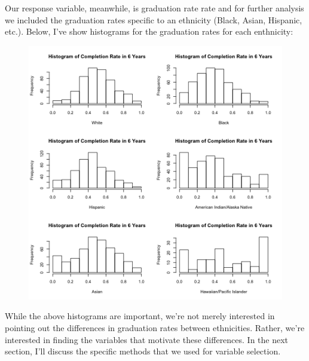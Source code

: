 \documentclass{article}
\begin{document}
Our response variable, meanwhile, is graduation rate rate and for further analysis we included the graduation rates specific to an ethnicity (Black, Asian, Hispanic, etc.). Below, I've show histograms for the graduation rates for each enthnicity:


\begin{figure}[!htb]
\includegraphics{../../images/histogram_race_completion.png}
\end{figure}

While the above histograms are important, we're not merely interested in pointing out the differences in graduation rates between ethnicities. Rather, we're interested in finding the variables that motivate these differences. In the next section, I'll discuss the specific methods that we used for variable selection.
\end{document}
